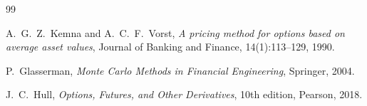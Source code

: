 \documentclass[11pt,a4paper]{article}
\theoremstyle{plain}
\theoremstyle{definition}
\theoremstyle{remark}
\begin{document}
\begin{thebibliography}{99}

A.\ G.\ Z.\ Kemna and A.\ C.\ F.\ Vorst,
\emph{A pricing method for options based on average asset values},
Journal of Banking and Finance, 14(1):113--129, 1990.

P.\ Glasserman,
\emph{Monte Carlo Methods in Financial Engineering},
Springer, 2004.

J.\ C.\ Hull,
\emph{Options, Futures, and Other Derivatives},
10th edition, Pearson, 2018.

\end{thebibliography}
\end{document}
